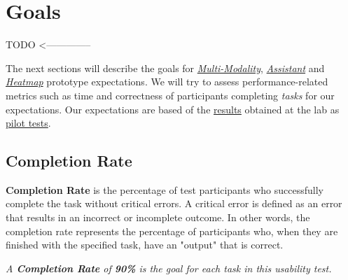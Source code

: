 
\section{Goals}
\label{sec:sec009}

TODO <--------------

The next sections will describe the goals for {\it \hyperlink{https://github.com/mida-project/prototype-multi-modality}{Multi-Modality}}, {\it \hyperlink{https://github.com/mida-project/prototype-multi-modality-assistant}{Assistant}} and {\it \hyperlink{https://github.com/mida-project/prototype-heatmap}{Heatmap}} prototype expectations. We will try to assess performance-related metrics such as time and correctness of participants completing \textit{tasks} for our expectations. Our expectations are based of the \hyperlink{https://docs.google.com/spreadsheets/d/1WwbvDO5Iz39Jr6H2ZzPth1o9DqhmpQz10Vtao7rvjfQ/edit?usp=sharing}{results} obtained at the lab as \hyperlink{https://www.nngroup.com/articles/pilot-testing/}{pilot tests}.


\subsection{Completion Rate}

\textbf{Completion Rate} is the percentage of test participants who successfully complete the task without critical errors. A critical error is defined as an error that results in an incorrect or incomplete outcome. In other words, the completion rate represents the percentage of participants who, when they are finished with the specified task, have an "output" that is correct.


\hfill

\textit{A \textbf{Completion Rate} of \textbf{90\%} is the goal for each task in this usability test.}

